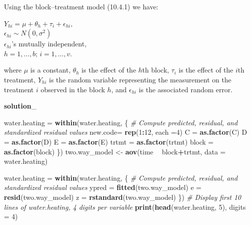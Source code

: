 \documentclass[12pt,]{article}
\newenvironment{Shaded}{\begin{snugshade}}{\end{snugshade}}
\newcommand{\KeywordTok}[1]{\textcolor[rgb]{0.13,0.29,0.53}{\textbf{#1}}}
\newcommand{\DataTypeTok}[1]{\textcolor[rgb]{0.13,0.29,0.53}{#1}}
\newcommand{\DecValTok}[1]{\textcolor[rgb]{0.00,0.00,0.81}{#1}}
\newcommand{\StringTok}[1]{\textcolor[rgb]{0.31,0.60,0.02}{#1}}
\newcommand{\CommentTok}[1]{\textcolor[rgb]{0.56,0.35,0.01}{\textit{#1}}}
\newcommand{\OperatorTok}[1]{\textcolor[rgb]{0.81,0.36,0.00}{\textbf{#1}}}
\newcommand{\NormalTok}[1]{#1}
\begin{document}
Using the block--treatment model (10.4.1) we have:

\begin{center}
$Y_{hi} = \mu + \theta_h + \tau_i + \epsilon_{hi},$\\
$\epsilon_{hi} \sim N(0,\sigma^2)$\\
$\epsilon_{hi}$'s mutually independent,\\
$h = 1,\ldots, b$; $i = 1, \ldots , v$.
\end{center}

where \(\mu\) is a constant, \(\theta_h\) is the effect of the \(h\)th
block, \(\tau_i\) is the effect of the \(i\)th treatment, \(Y_{hi}\) is
the random variable representing the measurement on the treatment \(i\)
observed in the block \(h\), and \(\epsilon_{hi}\) is the associated
random error.

\textbf{solution}\_

\begin{Shaded}
\begin{Highlighting}[]
\NormalTok{water.heating =}\StringTok{ }\KeywordTok{within}\NormalTok{(water.heating, \{}
  \CommentTok{# Compute predicted, residual, and standardized residual values}
\NormalTok{  new.code=}\StringTok{ }\KeywordTok{rep}\NormalTok{(}\DecValTok{1}\OperatorTok{:}\DecValTok{12}\NormalTok{, }\DataTypeTok{each =}\DecValTok{4}\NormalTok{)}
\NormalTok{  C =}\StringTok{ }\KeywordTok{as.factor}\NormalTok{(C)}
\NormalTok{  D =}\StringTok{ }\KeywordTok{as.factor}\NormalTok{(D)}
\NormalTok{  E =}\StringTok{ }\KeywordTok{as.factor}\NormalTok{(E)}
\NormalTok{  trtmt =}\StringTok{ }\KeywordTok{as.factor}\NormalTok{(trtmt)}
\NormalTok{  block =}\StringTok{ }\KeywordTok{as.factor}\NormalTok{(block)}
\NormalTok{  \})}
\NormalTok{two.way_model <-}\StringTok{ }\KeywordTok{aov}\NormalTok{(time }\OperatorTok{~}\StringTok{ }\NormalTok{block}\OperatorTok{+}\NormalTok{trtmt, }\DataTypeTok{data =}\NormalTok{ water.heating)}

\NormalTok{water.heating =}\StringTok{ }\KeywordTok{within}\NormalTok{(water.heating, \{}
  \CommentTok{# Compute predicted, residual, and standardized residual values}
\NormalTok{  ypred =}\StringTok{ }\KeywordTok{fitted}\NormalTok{(two.way_model)}
\NormalTok{  e =}\StringTok{ }\KeywordTok{resid}\NormalTok{(two.way_model) }
\NormalTok{  z =}\StringTok{ }\KeywordTok{rstandard}\NormalTok{(two.way_model)}
\NormalTok{  \})}
\CommentTok{# Display first 10 lines of water.heating, 4 digits per variable}
\KeywordTok{print}\NormalTok{(}\KeywordTok{head}\NormalTok{(water.heating, }\DecValTok{5}\NormalTok{), }\DataTypeTok{digits =} \DecValTok{4}\NormalTok{)}
\end{Highlighting}
\end{Shaded}
\end{document}
